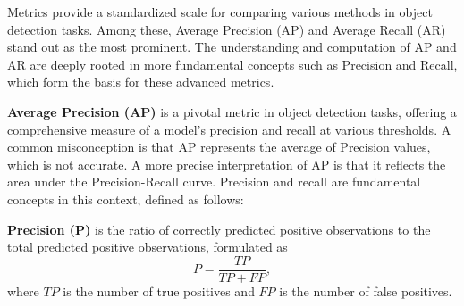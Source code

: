 \documentclass[report.tex]{subfiles}
\begin{document}


    Metrics provide a standardized scale for comparing various methods in object detection tasks. Among these, Average Precision (AP) and Average Recall (AR) stand out as the most prominent. The understanding and computation of AP and AR are deeply rooted in more fundamental concepts such as Precision and Recall, which form the basis for these advanced metrics.
    
    \textbf{Average Precision (AP)} is a pivotal metric in object detection tasks, offering a comprehensive measure of a model's precision and recall at various thresholds. A common misconception is that AP represents the average of Precision values, which is not accurate. A more precise interpretation of AP is that it reflects the area under the Precision-Recall curve. Precision and recall are fundamental concepts in this context, defined as follows:

    \textbf{Precision (P)} is the ratio of correctly predicted positive observations to the total predicted positive observations, formulated as 
    \begin{equation}
        P = \frac{TP}{TP + FP},
    \end{equation}
    where \( TP \) is the number of true positives and \( FP \) is the number of false positives.
\end{document}
